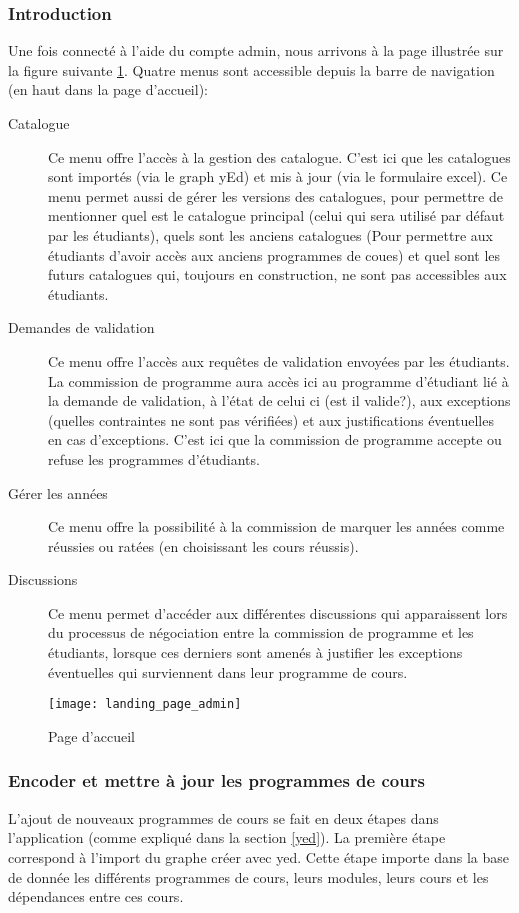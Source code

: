 \subsubsection{Introduction}
 Une fois connecté à l'aide du compte admin, nous arrivons à la page illustrée sur la figure suivante \ref{fig:landing_page_admin}. Quatre menus sont accessible depuis la barre de navigation (en haut dans la page d’accueil):
 \begin{description}
  \item [Catalogue] Ce menu offre l'accès à la gestion des catalogue. C'est ici que les catalogues sont importés (via le graph yEd) et mis à jour (via le formulaire excel). Ce menu permet aussi de gérer les versions des catalogues, pour permettre de mentionner quel est le catalogue principal (celui qui sera utilisé par défaut par les étudiants), quels sont les anciens catalogues (Pour permettre aux étudiants d'avoir accès aux anciens programmes de coues) et quel sont les futurs catalogues qui, toujours en construction, ne sont pas accessibles aux étudiants. 
  \item [Demandes de validation] Ce menu offre l'accès aux requêtes de validation envoyées par les étudiants. La commission de programme aura accès ici au programme d'étudiant lié à la demande de validation, à l'état de celui ci (est il valide?), aux exceptions (quelles contraintes ne sont pas vérifiées) et aux justifications éventuelles en cas d'exceptions. C'est ici que la commission de programme accepte ou refuse les programmes d'étudiants.
  \item [Gérer les années] Ce menu offre la possibilité à la commission de marquer les années comme réussies ou ratées (en choisissant les cours réussis). 
  \item [Discussions] Ce menu permet d'accéder aux différentes discussions qui apparaissent lors du processus de négociation entre la commission de programme et les étudiants, lorsque ces derniers sont amenés à justifier les exceptions éventuelles qui surviennent dans leur programme de cours. 
  \end{description}
\begin{figure}
\caption{Page d’accueil}
\label{fig:landing_page_admin}
\texttt{[image: landing\_page\_admin]}
\end{figure}
\subsubsection{Encoder et mettre à jour les programmes de cours}
L'ajout de nouveaux programmes de cours se fait en deux étapes dans l'application (comme expliqué dans la section \ref{yed}). La première étape correspond à l'import du graphe créer avec yed. Cette étape importe dans la base de donnée les différents programmes de cours, leurs modules, leurs cours et les dépendances entre ces cours.

